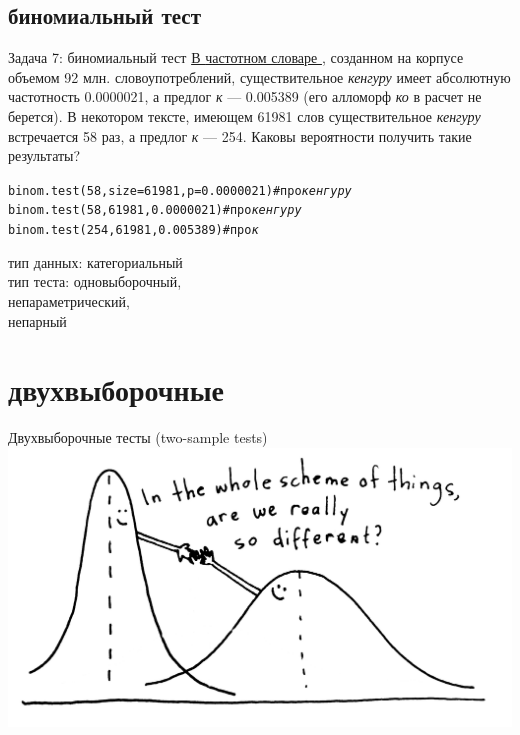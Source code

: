 \subsection{биномиальный тест}
\begin{frame}{Задача 7: биномиальный тест}
\href{http://dict.ruslang.ru/freq.php}{В \alert{частотном словаре \citep{lyashevskaya09}}}, созданном на корпусе объемом 92 млн. словоупотреблений, существительное \textit{кенгуру} имеет абсолютную частотность 0.0000021, а предлог \textit{к} — 0.005389 (его алломорф \textit{ко} в расчет не берется). В некотором тексте, имеющем 61981 слов существительное \textit{кенгуру} встречается 58 раз, а предлог \textit{к} — 254. Каковы вероятности получить такие результаты?\\ \pause
\vfill
\footnotesize
\begin{alltt}
binom.test(58, size = 61981, p = 0.0000021) \hfill \# про \textit{кенгуру} \\
binom.test(58, 61981, 0.0000021) \hfill \# про \textit{кенгуру}\\ 
binom.test(254, 61981, 0.005389) \hfill \# про \textit{к}
\end{alltt}
\normalsize
\vfill
тип данных: категориальный\\
тип теста: одновыборочный,\\
непараметрический,\\
непарный
\end{frame}
\section{двухвыборочные}
\begin{frame}{Двухвыборочные тесты (two-sample tests)}
\vfill
\includegraphics[width=\linewidth]{twosample.jpg}
\end{frame}
